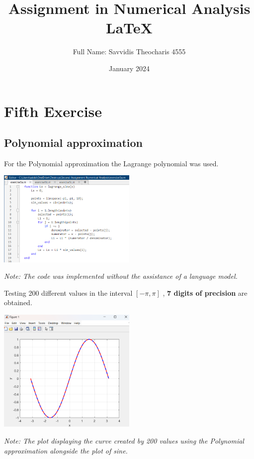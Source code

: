 \documentclass{article}
\title{Assignment in Numerical Analysis LaTeX}
\author{Full Name: Savvidis Theocharis 4555}
\date{ January 2024}
\begin{document}
\maketitle

\section{Fifth Exercise}
\subsection{Polynomial approximation}
For the Polynomial approximation the Lagrange polynomial was used.

\begin{tcolorbox}[colback=red!10, colframe=gray!80, width=\textwidth, sharp corners]
    \centering 
    \includegraphics[width=0.5\textwidth,height=0.21\textheight]{Exercise5aCode.png} 

    \vspace{0.5cm}
    \small\textit{Note: The code was implemented without the assistance of a language model. }
\end{tcolorbox}

Testing 200 different values in the interval $ [-\pi,\pi]$ ,\textbf{ 7 digits of precision} are obtained.

\begin{tcolorbox}[colback=red!10, colframe=gray!80, width=\textwidth, sharp corners]
    \centering 
    \includegraphics[width=0.5\textwidth,height=0.21\textheight]{Exercise5aPlot.png} 

    \vspace{0.5cm}
    \small\textit{Note: The plot displaying the curve created by 200 values using the Polynomial approximation alongside the plot of sine. }
\end{tcolorbox}
\end{document}
